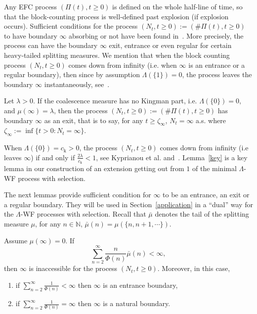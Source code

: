 \documentclass[AHL,Unicode,longabstracts,published]{cedram}
\newcommand{\rmk}{\mathrm{k}}
\newcommand{\bbN}{\mathbb{N}}
\newcommand*{\romanenumi}{\renewcommand*{\theenumi}{\roman{enumi}}}
\begin{document}
Any EFC process $(\Pi(t),t\geq 0)$ is defined on the whole half-line of time, so that the block-counting process is well-defined past explosion (if explosion occurs). Sufficient conditions for the process $(N_t,t\geq 0):=(\#\Pi(t),t\geq 0)$ to have boundary $\infty$ absorbing or not have been found in~\cite{cdiEFC}. More precisely, the process can have the boundary $\infty$ exit, entrance or even regular for certain heavy-tailed splitting measures. We mention that when the block counting process $(N_t,t\geq 0)$ comes down from infinity (i.e. when $\infty$ is an entrance or a regular boundary), then since by assumption $\Lambda(\{1\})=0$, the process leaves the boundary $\infty$ instantaneously, see~\cite[Lemma~2.5]{cdiEFC}.

\begin{lemm}\label{key}
Let $\lambda>0$. If the coalescence measure has no Kingman part, i.e. $\Lambda(\{0\})=0$, and $\mu(\infty)=\lambda$, then the process $(N_t,t\geq 0):=(\#\Pi(t),t\geq 0)$ has boundary $\infty$ as an exit, that is to say, for any $t\geq \zeta_{\infty}$, $N_t=\infty$ a.s.
where $\zeta_{\infty}:=\inf\{t>0: N_t=\infty\}$.
\end{lemm}

\begin{rema}\label{remkey}
When $\Lambda(\{0\})=c_{\rmk}>0$, the process $(N_t,t\geq 0)$ comes down from infinity (i.e leaves $\infty$) if and only if $\frac{2\lambda}{c_{\rmk}}<1$, see Kyprianou et al. \cite[Theorem~1.1]{kyprianou2017} and~\cite[Corollary~1.2-(1)]{cdiEFC}. Lemma~\ref{key} is a key lemma in our construction of an extension getting out from $1$ of the minimal $\Lambda$-WF process with selection.
\end{rema}

The next lemmas provide sufficient condition for $\infty$ to be an entrance, an exit or a regular boundary. They will be used in Section~\ref{application} in a ``dual'' way for the $\Lambda$-WF processes with selection. Recall that $\bar\mu$ denotes the tail of the splitting measure $\mu$, for any $n\in \bbN$, $\bar\mu(n)=\mu(\{n,n+1,\cdots\})$.
\begin{lemm} \label{nonexplosioncriterion}
Assume $\mu(\infty)=0$. If
\[
\sum_{n=2}^{\infty}\frac{n}{\Phi(n)}\bar{\mu}(n)<\infty,
\]
then $\infty$ is inaccessible for the process $(N_t,t\geq 0)$. Moreover, in this case,
\begin{enumerate}\romanenumi
\item if $\sum_{n=2}^{\infty}\frac{1}{\Phi(n)}<\infty$ then $\infty$ is an entrance boundary,
\item if $\sum_{n=2}^{\infty}\frac{1}{\Phi(n)}=\infty$ then $\infty$ is a natural boundary.
\end{enumerate}
\end{lemm}
\end{document}
